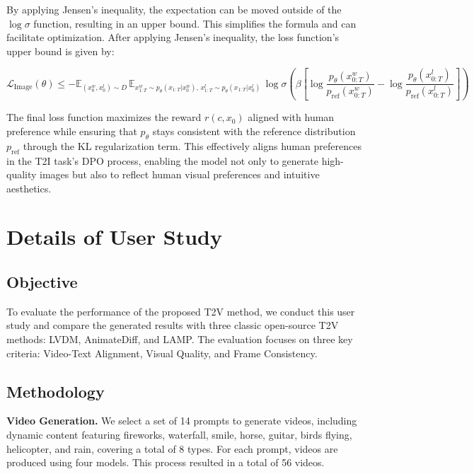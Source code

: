 By applying Jensen's inequality, the expectation can be moved outside of the \(\log \sigma\) function, resulting in an upper bound. This simplifies the formula and can facilitate optimization. After applying Jensen's inequality, the loss function's upper bound is given by:

\begin{equation}
\mathcal{L}_{\text{Image}}(\theta) \leq -\mathbb{E}_{(x_0^w, x_0^l) \sim D} \, \mathbb{E}_{x_{1:T}^w \sim p_\theta(x_{1:T} | x_0^w), \, x_{1:T}^l \sim p_\theta(x_{1:T} | x_0^l)} \, \log \sigma \left( \beta \left[ \log \frac{p_\theta(x_{0:T}^w)}{p_{\text{ref}}(x_{0:T}^w)} - \log \frac{p_\theta(x_{0:T}^l)}{p_{\text{ref}}(x_{0:T}^l)} \right] \right)
\end{equation}


The final loss function maximizes the reward \( r(c, x_0) \) aligned with human preference while ensuring that \( p_\theta \) stays consistent with the reference distribution \( p_{\text{ref}} \) through the KL regularization term. This effectively aligns human preferences in the T2I task's DPO process, enabling the model not only to generate high-quality images but also to reflect human visual preferences and intuitive aesthetics.



\section{Details of User Study}

\subsection{Objective}
To evaluate the performance of the proposed T2V method, we conduct this user study and compare the generated results with three classic open-source T2V methods: LVDM, AnimateDiff, and LAMP. The evaluation focuses on three key criteria: Video-Text Alignment, Visual Quality, and Frame Consistency.

\subsection{Methodology}

\textbf{Video Generation.} We select a set of 14 prompts to generate videos, including dynamic content featuring fireworks, waterfall, smile, horse, guitar, birds flying, helicopter, and rain, covering a total of 8 types. For each prompt, videos are produced using four models. This process resulted in a total of 56 videos.

